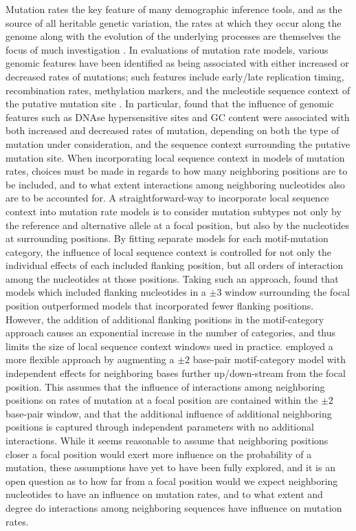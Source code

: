 Mutation rates the key feature of many demographic inference tools, and as the source of all heritable genetic variation, the rates at which they occur along the genome along with the evolution of the underlying processes are themselves the focus of much investigation \citep{Carlson2018, Chintalapati2020, Gao2019, Harris2017, Moore2021, Narasimhan2017, Seplyarskiy2023, Seplyarskiy2021b, Seplyarskiy2021a, Sgurel2014}. In evaluations of mutation rate models, various genomic features have been identified as being associated with either increased or decreased rates of mutations; such features include early/late replication timing, recombination rates, methylation markers, and the nucleotide sequence context of the putative mutation site \citep{Carlson2018, Seplyarskiy2023}. In particular, \citep{Carlson2018} found that the influence of genomic features such as DNAse hypersensitive sites and GC content were associated with both increased and decreased rates of mutation, depending on both the type of mutation under consideration, and the sequence context surrounding the putative mutation site. When incorporating local sequence context in models of mutation rates, choices must be made in regards to how many neighboring positions are to be included, and to what extent interactions among neighboring nucleotides also are to be accounted for. A straightforward-way to incorporate local sequence context into mutation rate models is to consider mutation subtypes not only by the reference and alternative allele at a focal position, but also by the nucleotides at surrounding positions. By fitting separate models for each motif-mutation category, the influence of local sequence context is controlled for not only the individual effects of each included flanking position, but all orders of interaction among the nucleotides at those positions. Taking such an approach, \citep{Carlson2018} found that models which included flanking nucleotides in a $\pm 3$ window surrounding the focal position outperformed models that incorporated fewer flanking positions. However, the addition of additional flanking positions in the motif-category approach causes an exponential increase in the number of categories, and thus limits the size of local sequence context windows used in practice. \citep{Seplyarskiy2023} employed a more flexible approach by augmenting a $\pm 2$ base-pair motif-category model with independent effects for neighboring bases further up/down-stream from the focal position. This assumes that the influence of interactions among neighboring positions on rates of mutation at a focal position are contained within the $\pm 2$ base-pair window, and that the additional influence of additional neighboring positions is captured through independent parameters with no additional interactions. While it seems reasonable to assume that neighboring positions closer a focal position would exert more influence on the probability of a mutation, these assumptions have yet to have been fully explored, and it is an open question as to how far from a focal position would we expect neighboring nucleotides to have an influence on mutation rates, and to what extent and degree do interactions among neighboring sequences have influence on mutation rates.
 
